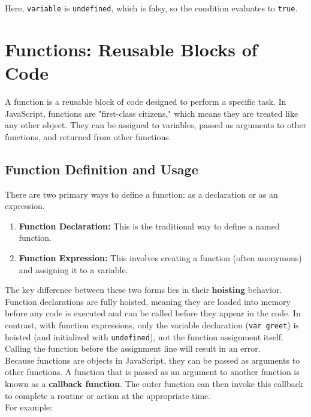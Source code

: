 \documentclass{scrbook}
\begin{document}
Here, \texttt{variable} is \texttt{undefined}, which is falsy, so the condition evaluates to \texttt{true}.

\chapter{Functions: Reusable Blocks of Code}

A function is a reusable block of code designed to perform a specific task. In JavaScript, functions are "first-class citizens," which means they are treated like any other object. They can be assigned to variables, passed as arguments to other functions, and returned from other functions.

\section{Function Definition and Usage}

There are two primary ways to define a function: as a declaration or as an expression.

\begin{enumerate}
    \item
    \textbf{Function Declaration:} This is the traditional way to define a named function.
    
    \item
    \textbf{Function Expression:} This involves creating a function (often anonymous) and assigning it to a variable.
\end{enumerate}

The key difference between these two forms lies in their \textbf{hoisting} behavior. Function declarations are fully hoisted, meaning they are loaded into memory before any code is executed and can be called before they appear in the code. In contrast, with function expressions, only the variable declaration (\texttt{var greet}) is hoisted (and initialized with \texttt{undefined}), not the function assignment itself. Calling the function before the assignment line will result in an error. \\

Because functions are objects in JavaScript, they can be passed as arguments to other functions. A function that is passed as an argument to another function is known as a \textbf{callback function}. The outer function can then invoke this callback to complete a routine or action at the appropriate time. \\

For example:
\end{document}

